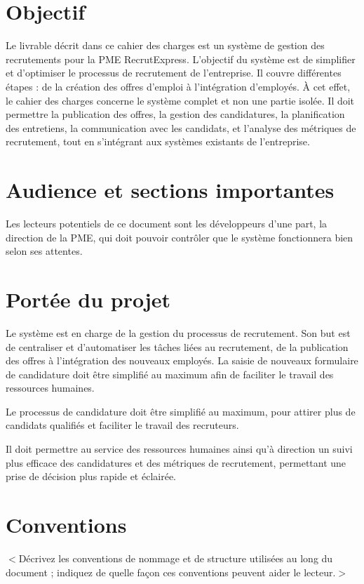 \documentclass{scrreprt}
\begin{document}
\section{Objectif}
Le livrable décrit dans ce cahier des charges est un système de gestion des recrutements pour la PME RecrutExpress. L'objectif du système est de simplifier et d'optimiser le processus de recrutement de l'entreprise. Il couvre différentes étapes : de la création des offres d'emploi à l'intégration d'employés. À cet effet, le cahier des charges concerne le système complet et non une partie isolée. Il doit permettre la publication des offres, la gestion des candidatures, la planification des entretiens, la communication avec les candidats, et l'analyse des métriques de recrutement, tout en s'intégrant aux systèmes existants de l'entreprise.

\section{Audience et sections importantes}
Les lecteurs potentiels de ce document sont les développeurs d'une part, la direction de la PME, qui doit pouvoir contrôler que le système fonctionnera bien selon ses attentes.

\section{Portée du projet}
Le système est en charge de la gestion du processus de recrutement. Son but est de centraliser et d'automatiser les tâches liées au recrutement, de la publication des offres à l'intégration des nouveaux employés. La saisie de nouveaux formulaire de candidature doit être simplifié au maximum afin de faciliter le travail des ressources humaines.

Le processus de candidature doit être simplifié au maximum, pour attirer plus de candidats qualifiés et faciliter le travail des recruteurs. 

Il doit permettre au service des ressources humaines ainsi qu'à direction un suivi plus efficace des candidatures et des métriques de recrutement, permettant une prise de décision plus rapide et éclairée.


\section{Conventions}
$<$Décrivez les conventions de nommage et de structure utilisées au long du document ; indiquez de quelle façon ces conventions peuvent aider le lecteur.$>$
\end{document}

